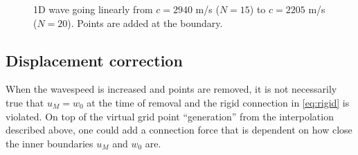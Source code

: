 \documentclass[dvipsnames]{article}
\begin{document}
\begin{figure}[h]
    \centering
    \hspace{0.05\textwidth}
    \caption{1D wave going linearly from $c = 2940$ m/s ($N=15$) to $c =2205$ m/s ($N=20$). Points are added at the boundary.}\label{fig:addAtBoundary}
\end{figure}
\subsection{Displacement correction}
When the wavespeed is increased and points are removed, it is not necessarily true that $u_M = w_0$ at the time of removal and the rigid connection in \eqref{eq:rigid} is violated. On top of the virtual grid point ``generation'' from the interpolation described above, one could add a connection force that is dependent on how close the inner boundaries $u_M$ and $w_0$ are.
\end{document}
